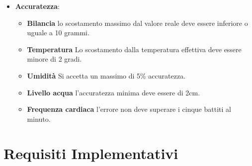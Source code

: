 \begin{itemize}
\begin{itemize}
            \end{itemize}
        \item \textbf{Accuratezza}:
            \begin{itemize}
                \item \textbf{Bilancia} lo scostamento massimo dal valore reale deve essere inferiore o uguale a 10 grammi.
                \item \textbf{Temperatura}  Lo scostamento dalla temperatura effettiva deve essere minore di 2 gradi.
                \item \textbf{Umidità} Si accetta un massimo di 5\% accuratezza.
                \item \textbf{Livello acqua} l'accuratezza minima deve essere di 2cm.
                \item \textbf{Frequenza cardiaca} l'errore non deve superare i cinque battiti al minuto.
            \end{itemize}
    \end{itemize}    
    

	\section{Requisiti Implementativi}
